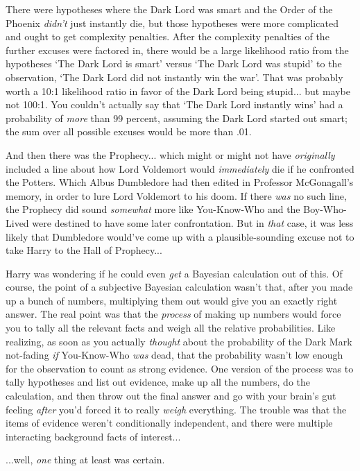 There were hypotheses where the Dark Lord was smart and the Order of the
Phoenix \emph{didn't} just instantly die, but those hypotheses were more
complicated and ought to get complexity penalties. After the complexity
penalties of the further excuses were factored in, there would be a
large likelihood ratio from the hypotheses `The Dark Lord is smart'
versus `The Dark Lord was stupid' to the observation, `The Dark Lord did
not instantly win the war'. That was probably worth a 10:1 likelihood
ratio in favor of the Dark Lord being stupid... but maybe not
100:1. You couldn't actually say that `The Dark Lord instantly wins' had
a probability of \emph{more} than 99 percent, assuming the Dark Lord
started out smart; the sum over all possible excuses would be more than
.01.

And then there was the Prophecy... which might or might not have
\emph{originally} included a line about how Lord Voldemort would
\emph{immediately} die if he confronted the Potters. Which Albus
Dumbledore had then edited in Professor McGonagall's memory, in order to
lure Lord Voldemort to his doom. If there \emph{was} no such line, the
Prophecy did sound \emph{somewhat} more like You-Know-Who and the
Boy-Who-Lived were destined to have some later confrontation. But in
\emph{that} case, it was less likely that Dumbledore would've come up
with a plausible-sounding excuse not to take Harry to the Hall of
Prophecy...

Harry was wondering if he could even \emph{get} a Bayesian calculation
out of this. Of course, the point of a subjective Bayesian calculation
wasn't that, after you made up a bunch of numbers, multiplying them out
would give you an exactly right answer. The real point was that the
\emph{process} of making up numbers would force you to tally all the
relevant facts and weigh all the relative probabilities. Like realizing,
as soon as you actually \emph{thought} about the probability of the Dark
Mark not-fading \emph{if} You-Know-Who \emph{was} dead, that the
probability wasn't low enough for the observation to count as strong
evidence. One version of the process was to tally hypotheses and list
out evidence, make up all the numbers, do the calculation, and then
throw out the final answer and go with your brain's gut feeling
\emph{after} you'd forced it to really \emph{weigh} everything. The
trouble was that the items of evidence weren't conditionally
independent, and there were multiple interacting background facts of
interest...

...well, \emph{one} thing at least was certain.

